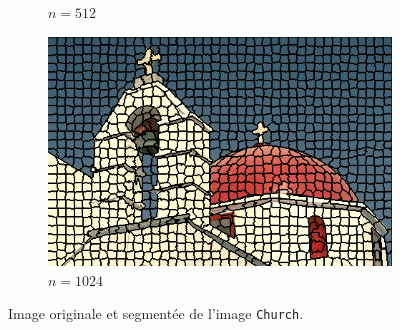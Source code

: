 \documentclass[12pt]{article}
\begin{document}
\begin{figure}
\begin{subfigure}{0.49\textwidth}
    \caption{$n=512$}
  \end{subfigure}
  \begin{subfigure}{0.49\textwidth}
    \centering
    \includegraphics[width=1\textwidth]{church/church_segmented_1024.png}
    \caption{$n=1024$}
  \end{subfigure}
  \caption{Image originale et segment\'ee de l'image \texttt{Church}.}
  \label{fig:church_segm}
\end{figure}
\end{document}
